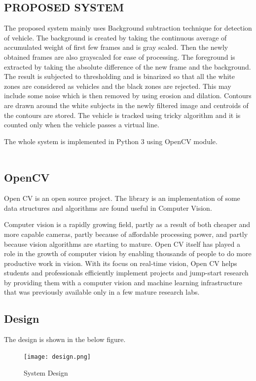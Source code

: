 \documentclass[12pt, a4paper]{article}
\begin{document}
\newpage
\begin{Large}\section{PROPOSED SYSTEM}\end{Large}
\hspace{3cm}The proposed system mainly uses Background subtraction technique for detection of vehicle. The background is created by taking the continuous average of accumulated weight of first few frames and is gray scaled. Then the newly obtained frames are also grayscaled for ease of processing. The foreground is extracted by taking the absolute difference of the new frame and the background. The result is subjected to thresholding and is binarized so that all the white zones are considered as vehicles and the black zones are rejected. This may include some noise which is then removed by using erosion and dilation. Contours are drawn around the white subjects in the newly filtered image and centroids of the contours are stored. The vehicle is tracked using tricky algorithm and it is counted only when the vehicle passes a virtual line.
\par The whole system is implemented in Python 3 using OpenCV module.
\\
\\
\begin{large}\subsection{OpenCV}\end{large}
\hspace{3cm}
Open CV is an open source project. The library is an implementation of
some data structures and algorithms are found useful in Computer Vision.
\par Computer vision is a rapidly growing field, partly as a result of both cheaper and more capable cameras, partly because of affordable processing power, and partly because vision algorithms are starting to mature. Open CV itself has played a role in the growth of computer vision by enabling thousands of people to do more productive work in vision. With its focus on real-time vision, Open CV helps students and professionals efficiently implement projects and jump-start research by providing them with a computer vision and machine learning infrastructure that was previously available only in a few mature research labs.

\newpage
\begin{large}\subsection{Design}\end{large}
The design is shown in the below figure.
\begin{figure}[h!]\texttt{[image: design.png]}\caption{System Design}\end{figure}
\end{document}
